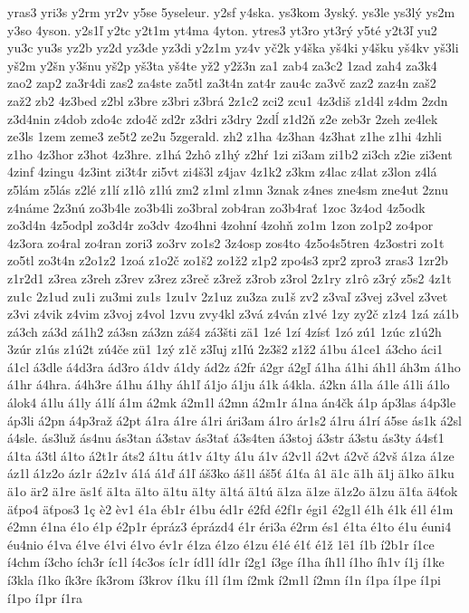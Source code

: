 {yras3
yri3s
y2rm
yr2v
y5se
5yseleur.
y2sf
y4ska.
ys3kom
3yský.
ys3le
ys3lý
ys2m
y3so
4yson.
y2s1ľ
y2tc
y2t1m
yt4ma
4yton.
ytres3
yt3ro
yt3rý
y5té
y2t3ľ
yu2
yu3c
yu3s
yz2b
yz2d
yz3de
yz3di
y2z1m
yz4v
yč2k
y4ška
yš4ki
y4šku
yš4kv
yš3li
yš2m
y2šn
y3šnu
yš2p
yš3ta
yš4te
yž2
y2ž3n
za1
zab4
za3c2
1zad
zah4
za3k4
zao2
zap2
za3r4di
zas2
za4ste
za5tl
za3t4n
zat4r
zau4c
za3vč
zaz2
zaz4n
zaš2
zaž2
zb2
4z3bed
z2bl
z3bre
z3bri
z3brá
2z1c2
zci2
zcu1
4z3diš
z1d4l
z4dm
2zdn
z3d4nin
z4dob
zdo4c
zdo4č
zd2r
z3dri
z3dry
2zdĺ
z1d2ň
z2e
zeb3r
2zeh
ze4lek
ze3ls
1zem
zeme3
ze5t2
ze2u
5zgerald.
zh2
z1ha
4z3han
4z3hat
z1he
z1hi
4zhli
z1ho
4z3hor
z3hot
4z3hre.
z1há
2zhô
z1hý
z2hŕ
1zi
zi3am
zi1b2
zi3ch
z2ie
zi3ent
4zinf
4zingu
4z3int
zi3t4r
zi5vt
zi4š3l
z4jav
4z1k2
z3km
z4lac
z4lat
z3lon
z4lá
z5lám
z5lás
z2lé
z1lí
z1lô
z1lú
zm2
z1ml
z1mn
3znak
z4nes
zne4sm
zne4ut
2znu
z4náme
2z3nú
zo3b4le
zo3b4li
zo3bral
zob4ran
zo3b4rať
1zoc
3z4od
4z5odk
zo3d4n
4z5odpl
zo3d4r
zo3dv
4zo4hni
4zohní
4zohň
zo1m
1zon
zo1p2
zo4por
4z3ora
zo4ral
zo4ran
zori3
zo3rv
zo1s2
3z4osp
zos4to
4z5o4s5tren
4z3ostri
zo1t
zo5tl
zo3t4n
z2o1z2
1zoá
z1o2č
zo1š2
zo1ž2
z1p2
zpo4s3
zpr2
zpro3
zras3
1zr2b
z1r2d1
z3rea
z3reh
z3rev
z3rez
z3reč
z3rež
z3rob
z3rol
2z1ry
z1rô
z3rý
z5s2
4z1t
zu1c
2z1ud
zu1i
zu3mi
zu1s
1zu1v
2z1uz
zu3za
zu1š
zv2
z3vaľ
z3vej
z3vel
z3vet
z3vi
z4vik
z4vim
z3voj
z4vol
1zvu
zvy4kl
z3vá
z4ván
z1vé
1zy
zy2č
z1z4
1zá
zá1b
zá3ch
zá3d
zá1h2
zá3sn
zá3zn
záš4
zá3šti
zä1
1zé
1zí
4zísť
1zó
zú1
1zúc
z1ú2h
3zúr
z1ús
z1ú2t
zú4če
zü1
1zý
z1č
z3ľuj
z1ľú
2z3š2
z1ž2
á1bu
á1ce1
á3cho
áci1
á1cl
á3dle
á4d3ra
ád3ro
á1dv
á1dy
ád2z
á2fr
á2gr
á2gľ
á1ha
á1hi
áh1l
áh3m
á1ho
á1hr
á4hra.
á4h3re
á1hu
á1hy
áh1ľ
á1jo
á1ju
á1k
á4kla.
á2kn
á1la
á1le
á1li
á1lo
álok4
á1lu
á1ly
á1lí
á1m
á2mk
á2m1l
á2mn
á2m1r
á1na
án4čk
á1p
áp3las
á4p3le
áp3li
á2pn
á4p3raž
á2pt
á1ra
á1re
á1ri
ári3am
á1ro
ár1s2
á1ru
á1rí
á5se
ás1k
á2sl
á4sle.
ás3luž
ás4nu
ás3tan
á3stav
ás3tať
á3s4ten
á3stoj
á3str
á3stu
ás3ty
á4sť1
á1ta
á3tl
á1to
á2t1r
áts2
á1tu
át1v
á1ty
á1u
á1v
á2v1l
á2vt
á2vč
á2vš
á1za
á1ze
áz1l
á1z2o
áz1r
á2z1v
á1á
á1ď
á1ľ
áš3ko
áš1l
áš5ť
á1ťa
â1
ä1c
ä1h
ä1j
ä1ko
ä1ku
ä1o
är2
ä1re
äs1ť
ä1ta
ä1to
ä1tu
ä1ty
ä1tá
ä1tú
ä1za
ä1ze
ä1z2o
ä1zu
ä1ťa
ä4ťok
äťpo4
äťpos3
1ç
è2
èv1
é1a
éb1r
é1bu
éd1r
é2fd
é2f1r
égi1
é2g1l
é1h
é1k
é1l
é1m
é2mn
é1na
é1o
é1p
é2p1r
épráz3
éprázd4
é1r
éri3a
é2rm
és1
é1ta
é1to
é1u
éuni4
éu4nio
é1va
é1ve
é1vi
é1vo
év1r
é1za
é1zo
é1zu
é1é
é1ť
é1ž
1ë1
í1b
í2b1r
í1ce
í4chm
í3cho
ích3r
íc1l
í4c3os
íc1r
íd1l
íd1r
í2g1
í3ge
í1ha
íh1l
í1ho
íh1v
í1j
í1ke
í3kla
í1ko
ík3re
ík3rom
í3krov
í1ku
í1l
í1m
í2mk
í2m1l
í2mn
í1n
í1pa
í1pe
í1pi
í1po
í1pr
í1ra
}

